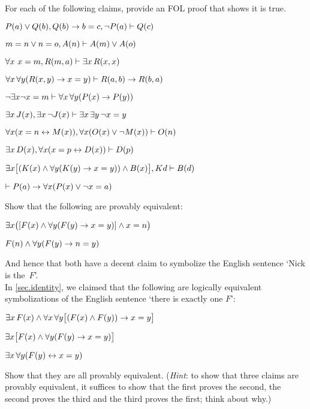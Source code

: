 \practiceproblems
\problempart
\label{pr.identity}
For each of the following claims, provide an FOL proof that shows it
is true.
\begin{compactlist}
\item $\mathord{P}(a) \vee \mathord{Q}(b), \mathord{Q}(b) \rightarrow b=c, \neg\mathord{P}(a) \vdash \mathord{Q}(c)$
\item $m=n \vee n=o, \mathord{A}(n) \vdash \mathord{A}(m) \vee \mathord{A}(o)$
\item $\forall x\ x=m, \mathord{R}(m,a) \vdash \exists x\,\mathord{R}(x,x)$
\item $\forall x\,\forall y(\mathord{R}(x,y) \rightarrow x=y)\vdash \mathord{R}(a,b) \rightarrow \mathord{R}(b,a)$
\item $\neg \exists x\neg x = m \vdash \forall x\,\forall y (\mathord{P}(x) \rightarrow \mathord{P}(y))$
\item $\exists x\,\mathord{J}(x), \exists x\, \neg\mathord{J}(x)\vdash \exists x\, \exists y\, \neg x = y$
\item $\forall x(x=n \leftrightarrow \mathord{M}(x)), \forall x(\mathord{O}(x) \vee \neg \mathord{M}(x))\vdash \mathord{O}(n)$
\item $\exists x\,\mathord{D}(x), \forall x(x=p \leftrightarrow \mathord{D}(x))\vdash \mathord{D}(p)$
\item $\exists x\bigl[(\mathord{K}(x) \wedge \forall y(\mathord{K}(y) \rightarrow x=y)) \wedge \mathord{B}(x)\bigr], Kd\vdash \mathord{B}(d)$
\item $\vdash \mathord{P}(a) \rightarrow \forall x(\mathord{P}(x) \vee \neg x = a)$
\end{compactlist}

\problempart
Show that the following are provably equivalent:
\begin{ebullet}
\item $\exists x \bigl([\mathord{F}(x) \wedge \forall y (\mathord{F}(y) \rightarrow x = y)] \wedge x = n\bigr)$
\item $\mathord{F}(n) \wedge \forall y (\mathord{F}(y) \rightarrow n= y)$
\end{ebullet}
And hence that both have a decent claim to symbolize the English sentence `Nick is the~$F$'.\\

\problempart
In \cref{sec.identity}, we claimed that the following are logically equivalent symbolizations of the English sentence `there is exactly one $F$':
\begin{ebullet}
\item $\exists x\,\mathord{F}(x) \wedge \forall x\, \forall y \bigl[(\mathord{F}(x) \wedge \mathord{F}(y)) \rightarrow x = y\bigr]$
\item $\exists x \bigl[\mathord{F}(x) \wedge \forall y (\mathord{F}(y) \rightarrow x = y)\bigr]$
\item $\exists x\, \forall y (\mathord{F}(y) \leftrightarrow x = y)$
\end{ebullet}
Show that they are all provably equivalent. (\emph{Hint}: to show that three claims are provably equivalent, it suffices to show that the first proves the second, the second proves the third and the third proves the first; think about why.)


